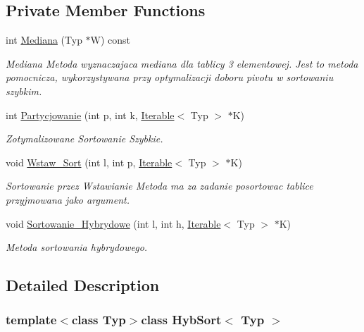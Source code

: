 \subsection*{Private Member Functions}
\begin{DoxyCompactItemize}
\item 
int \hyperlink{class_hyb_sort_a3a202fcd27870bb2b56bb256586cacdc}{Mediana} (Typ $\ast$W) const 
\begin{DoxyCompactList}\small\item\em Mediana Metoda wyznaczajaca mediana dla tablicy 3 elementowej. Jest to metoda pomocnicza, wykorzystywana przy optymalizacji doboru pivotu w sortowaniu szybkim. \end{DoxyCompactList}\item 
int \hyperlink{class_hyb_sort_ac6196e148240080a240ca990c7f740bb}{Partycjowanie} (int p, int k, \hyperlink{class_iterable}{Iterable}$<$ Typ $>$ $\ast$K)
\begin{DoxyCompactList}\small\item\em Zotymalizowane Sortowanie Szybkie. \end{DoxyCompactList}\item 
void \hyperlink{class_hyb_sort_afdf20a6c2fc2101bf9b1851919f910b7}{Wstaw\-\_\-\-Sort} (int l, int p, \hyperlink{class_iterable}{Iterable}$<$ Typ $>$ $\ast$K)
\begin{DoxyCompactList}\small\item\em Sortowanie przez Wstawianie Metoda ma za zadanie posortowac tablice przyjmowana jako argument. \end{DoxyCompactList}\item 
void \hyperlink{class_hyb_sort_aafe7b17d8af23857d648f8f35a281809}{Sortowanie\-\_\-\-Hybrydowe} (int l, int h, \hyperlink{class_iterable}{Iterable}$<$ Typ $>$ $\ast$K)
\begin{DoxyCompactList}\small\item\em Metoda sortowania hybrydowego. \end{DoxyCompactList}\end{DoxyCompactItemize}


\subsection{Detailed Description}
\subsubsection*{template$<$class Typ$>$class Hyb\-Sort$<$ Typ $>$}

